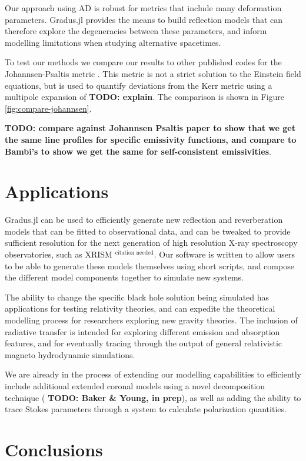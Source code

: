 \documentclass[fleqn,usenatbib]{mnras}
\newcommand{\citneeded}{{\bf \color{red} $^{\text{citation needed}}$}}
\newcommand{\todo}[1]{{\noindent \bf \color{red} TODO: #1}}
\newcommand{\Gradus}{Gradus.jl }
\begin{document}
Our approach using AD is robust for metrics that include many deformation
parameters. \Gradus provides the means to build reflection models that can
therefore explore the degeneracies between these parameters, and inform
modelling limitations when studying alternative spacetimes.

To test our methods we compare our results to other published codes for the
Johannsen-Psaltis metric \cite{johannsen_regular_2013}. This metric is not a
strict solution to the Einstein field equations, but is used to quantify
deviations from the Kerr metric using a multipole expansion of \todo{explain}.
The comparison is shown in Figure \ref{fig:compare-johannsen}.

\todo{compare against Johannsen Psaltis paper to show that we get the same line profiles for specific emissivity functions, and compare to Bambi's to show we get the same for self-consistent emissivities}.

\section{Applications}
\label{sec:applications}

\Gradus can be used to efficiently generate new reflection and reverberation
models that can be fitted to observational data, and can be tweaked to provide
sufficient resolution for the next generation of high resolution X-ray
spectroscopy observatories, such as XRISM\citneeded. Our software is written to
allow users to be able to generate these models themselves using short scripts,
and compose the different model components together to simulate new systems.

The ability to change the specific black hole solution being simulated has
applications for testing relativity theories, and can expedite the theoretical
modelling process for researchers exploring new gravity theories. The inclusion
of radiative transfer is intended for exploring different emission and
absorption features, and for eventually tracing through the output of general
relativistic magneto hydrodynamic simulations.

We are already in the process of extending our modelling capabilities to
efficiently include additional extended coronal models using a novel
decomposition technique (\todo{Baker \& Young, in prep}), as well as adding
the ability to trace Stokes parameters through a system to calculate
polarization quantities.

\section{Conclusions}
\label{sec:conclusion}
\end{document}
